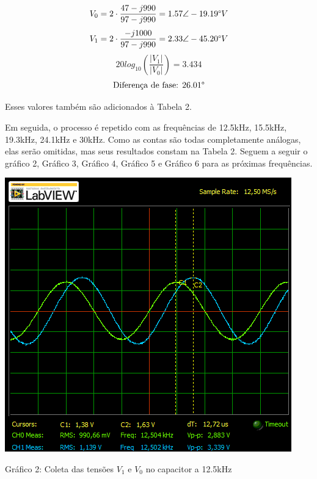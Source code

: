 \documentclass[a4 paper]{article}
\begin{document}
\[V_0 = 2\cdot\frac{47-j990}{97-j990}=1.57\angle-19.19\text{\textdegree}V\]
\[V_1=2\cdot\frac{-j1000}{97-j990}=2.33\angle-45.20\text{\textdegree}V\]
\[20log_{10}\left(\frac{|V_1|}{|V_0|}\right)=3.434\]
\[\text{Diferença de fase: }26.01\text{\textdegree}\]

Esses valores também são adicionados à Tabela 2.

Em seguida, o processo é repetido com as frequências de 12.5kHz, 15.5kHz, 19.3kHz, 24.1kHz e 30kHz. Como as contas são todas completamente análogas, elas serão omitidas, mas seus resultados constam na Tabela 2. Seguem a seguir o gráfico 2, Gráfico 3, Gráfico 4, Gráfico 5 e Gráfico 6 para as próximas frequências.


\begin{table}[h]
\centering
\includegraphics[scale=0.7]{graficos/circ1/rgadicoa1-2-12_5}
\end{table}

\begin{center}
Gráfico 2: Coleta das tensões $V_1$ e $V_0$ no capacitor a 12.5kHz
\end{center}
\end{document}
